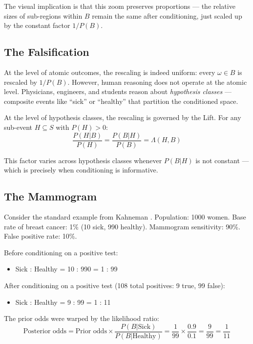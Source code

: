 \documentclass[12pt]{article}
\begin{document}
The visual implication is that this zoom preserves proportions --- the relative sizes of sub-regions within $B$ remain the same after conditioning, just scaled up by the constant factor $1/P(B)$.

\subsection{The Falsification}

At the level of atomic outcomes, the rescaling is indeed uniform: every $\omega \in B$ is rescaled by $1/P(B)$. However, human reasoning does not operate at the atomic level. Physicians, engineers, and students reason about \textit{hypothesis classes} --- composite events like ``sick'' or ``healthy'' that partition the conditioned space.

At the level of hypothesis classes, the rescaling is governed by the Lift. For any sub-event $H \subseteq S$ with $P(H) > 0$:
\begin{equation}
\frac{P(H|B)}{P(H)} = \frac{P(B|H)}{P(B)} = \Lambda(H, B)
\end{equation}

This factor varies across hypothesis classes whenever $P(B|H)$ is not constant --- which is precisely when conditioning is informative.

\subsection{The Mammogram}

Consider the standard example from Kahneman \cite{kahneman2011}. Population: 1000 women. Base rate of breast cancer: 1\% (10 sick, 990 healthy). Mammogram sensitivity: 90\%. False positive rate: 10\%.

Before conditioning on a positive test:
\begin{itemize}[nosep]
\item Sick : Healthy = 10 : 990 = 1 : 99
\end{itemize}

After conditioning on a positive test (108 total positives: 9 true, 99 false):
\begin{itemize}[nosep]
\item Sick : Healthy = 9 : 99 = 1 : 11
\end{itemize}

The prior odds were warped by the likelihood ratio:
\begin{equation}
\text{Posterior odds} = \text{Prior odds} \times \frac{P(B|\text{Sick})}{P(B|\text{Healthy})} = \frac{1}{99} \times \frac{0.9}{0.1} = \frac{9}{99} = \frac{1}{11}
\end{equation}
\end{document}
